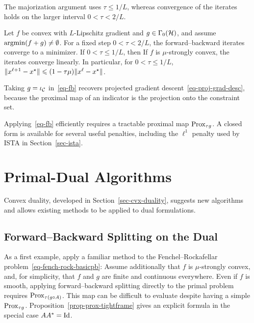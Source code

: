 The majorization argument uses $\tau\leq1/L$, whereas convergence of the iterates holds on the larger interval $0<\tau<2/L$.

\begin{thm}\label{thm-fb-conv}
Let $f$ be convex with $L$-Lipschitz gradient and $g\in\Gamma_0(\mathcal{H})$, and assume $\operatorname{argmin}(f+g)\neq\emptyset$. For a fixed step $0<\tau<2/L$, the forward--backward iterates converge to a minimizer. If $0<\tau\leq1/L$, then
If $f$ is $\mu$-strongly convex, the iterates converge linearly. In particular, for $0<\tau\leq1/L$,
$\lVert x^{\ell+1}-x^\star\rVert\leqslant(1-\tau\mu)\lVert x^\ell-x^\star\rVert$.
\end{thm}

Taking $g=\iota_{\mathcal{C}}$ in~\eqref{eq-fb} recovers projected gradient descent~\eqref{eq-proj-grad-desc}, because the proximal map of an indicator is the projection onto the constraint set.

Applying~\eqref{eq-fb} efficiently requires a tractable proximal map $\operatorname{Prox}_{\tau g}$. A closed form is available for several useful penalties, including the $\ell^1$ penalty used by ISTA in Section~\ref{sec-ista}.



\section{Primal-Dual Algorithms}

Convex duality, developed in Section~\ref{sec-cvx-duality}, suggests new algorithms and allows existing methods to be applied to dual formulations.

\subsection{Forward--Backward Splitting on the Dual}
\label{sec-fb-dual}

As a first example, apply a familiar method to the Fenchel--Rockafellar problem~\eqref{eq-fench-rock-basicpb}:
Assume additionally that $f$ is $\mu$-strongly convex, and, for simplicity, that $f$ and $g$ are finite and continuous everywhere. Even if $f$ is smooth, applying forward--backward splitting directly to the primal problem requires $\operatorname{Prox}_{\tau(g\circ A)}$. This map can be difficult to evaluate despite having a simple $\operatorname{Prox}_{\tau g}$. Proposition~\ref{prop-prox-tightframe} gives an explicit formula in the special case $AA^*=\mathrm{Id}$.

